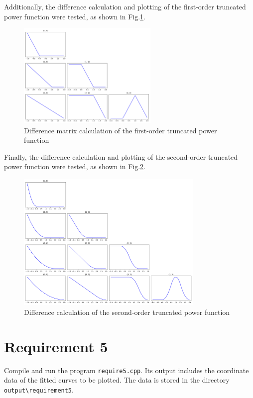 \documentclass[a4paper]{article}
\begin{document}
\begin{sloppypar}
Additionally, the difference calculation and plotting of the first-order
truncated power function were tested, as shown in
Fig.\ref{fig:divided_trunc_power_1}.
\begin{figure}[H]
  \centering
  \includegraphics[width=0.6\textwidth]{../figure/problemF/divided_1.png}
  \renewcommand{\figurename}{Fig.}
  \caption{Difference matrix calculation of the first-order truncated power function}
  \label{fig:divided_trunc_power_1}
\end{figure}

Finally, the difference calculation and plotting of the second-order truncated
power function were tested, as shown in Fig.\ref{fig:divided_trunc_power_2}.
\begin{figure}[H]
  \centering
  \includegraphics[width=0.8\textwidth]{../figure/problemF/divided_2.png}
  \renewcommand{\figurename}{Fig.}
  \caption{Difference calculation of the second-order truncated power function}
  \label{fig:divided_trunc_power_2}
\end{figure}

\section{Requirement 5}
Compile and run the program \verb|require5.cpp|. Its output includes the coordinate data of the fitted curves to be plotted. The data is stored in the directory \verb|output\requirement5|.


\end{sloppypar}
\end{document}
